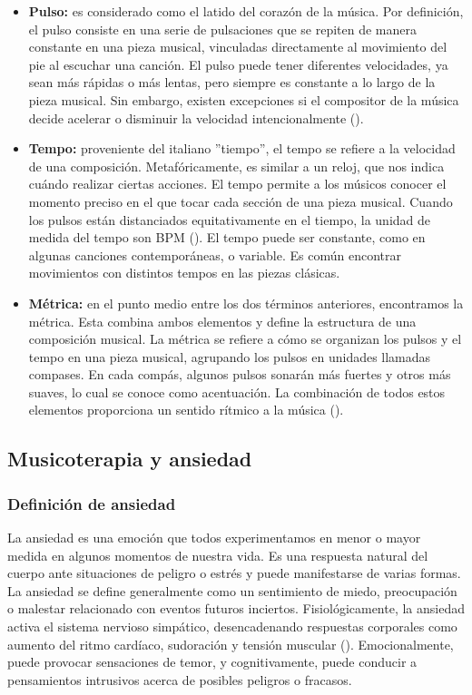 \begin{itemize}
	\item \textbf{Pulso:} es considerado como el latido del corazón de la música. Por definición, el pulso consiste en una serie de pulsaciones que se repiten de manera constante en una pieza musical, vinculadas directamente al movimiento del pie al escuchar una canción. El pulso puede tener diferentes velocidades, ya sean más rápidas o más lentas, pero siempre es constante a lo largo de la pieza musical. Sin embargo, existen excepciones si el compositor de la música decide acelerar o disminuir la velocidad intencionalmente (\cite{VIOLÍNZN:2024}).
	\item \textbf{Tempo:} proveniente del italiano ''tiempo'', el tempo se refiere a la velocidad de una composición. Metafóricamente, es similar a un reloj, que nos indica cuándo realizar ciertas acciones. El tempo permite a los músicos conocer el momento preciso en el que tocar cada sección de una pieza musical. Cuando los pulsos están distanciados equitativamente en el tiempo, la unidad de medida del tempo son BPM (\cite{MASTEREDBLOGS:2021}). El tempo puede ser constante, como en algunas canciones contemporáneas, o variable. Es común encontrar movimientos con distintos tempos en las piezas clásicas.
	\item \textbf{Métrica:} en el punto medio entre los dos términos anteriores, encontramos la métrica. Esta combina ambos elementos y define la estructura de una composición musical. La métrica se refiere a cómo se organizan los pulsos y el tempo en una pieza musical, agrupando los pulsos en unidades llamadas compases. En cada compás, algunos pulsos sonarán más fuertes y otros más suaves, lo cual se conoce como acentuación. La combinación de todos estos elementos proporciona un sentido rítmico a la música (\cite{COMPOMUSICAL:2024}).
\end{itemize}


\subsection{Musicoterapia y ansiedad}

\subsubsection{Definición de ansiedad}

La ansiedad es una emoción que todos experimentamos en menor o mayor medida en algunos momentos de nuestra vida. Es una respuesta natural del cuerpo ante situaciones de peligro o estrés y puede manifestarse de varias formas. La ansiedad se define generalmente como un sentimiento de miedo, preocupación o malestar relacionado con eventos futuros inciertos. Fisiológicamente, la ansiedad activa el sistema nervioso simpático, desencadenando respuestas corporales como aumento del ritmo cardíaco, sudoración y tensión muscular (\cite{APA:2013}). Emocionalmente, puede provocar sensaciones de temor, y cognitivamente, puede conducir a pensamientos intrusivos acerca de posibles peligros o fracasos.

